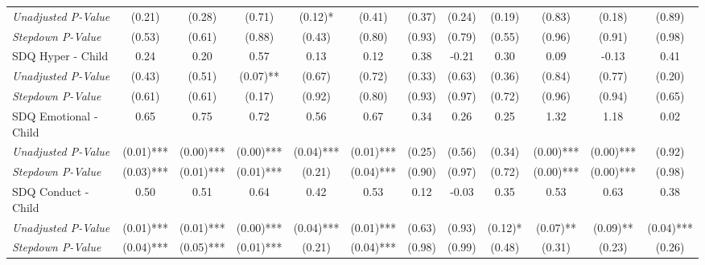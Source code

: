 \begin{tabular}{l c c c c c c c c c c c}
\quad \textit{Unadjusted P-Value} & (0.21) & (0.28) & (0.71) & (0.12)* & (0.41) & (0.37) & (0.24) & (0.19) & (0.83) & (0.18) & (0.89) \\
\quad \textit{Stepdown P-Value} & (0.53) & (0.61) & (0.88) & (0.43) & (0.80) & (0.93) & (0.79) & (0.55) & (0.96) & (0.91) & (0.98) \\
SDQ Hyper - Child & 0.24 & 0.20 & 0.57 & 0.13 & 0.12 & 0.38 & -0.21 & 0.30 & 0.09 & -0.13 & 0.41 \\
\quad \textit{Unadjusted P-Value} & (0.43) & (0.51) & (0.07)** & (0.67) & (0.72) & (0.33) & (0.63) & (0.36) & (0.84) & (0.77) & (0.20) \\
\quad \textit{Stepdown P-Value} & (0.61) & (0.61) & (0.17) & (0.92) & (0.80) & (0.93) & (0.97) & (0.72) & (0.96) & (0.94) & (0.65) \\
SDQ Emotional - Child & 0.65 & 0.75 & 0.72 & 0.56 & 0.67 & 0.34 & 0.26 & 0.25 & 1.32 & 1.18 & 0.02 \\
\quad \textit{Unadjusted P-Value} & (0.01)*** & (0.00)*** & (0.00)*** & (0.04)*** & (0.01)*** & (0.25) & (0.56) & (0.34) & (0.00)*** & (0.00)*** & (0.92) \\
\quad \textit{Stepdown P-Value} & (0.03)*** & (0.01)*** & (0.01)*** & (0.21) & (0.04)*** & (0.90) & (0.97) & (0.72) & (0.00)*** & (0.00)*** & (0.98) \\
SDQ Conduct - Child & 0.50 & 0.51 & 0.64 & 0.42 & 0.53 & 0.12 & -0.03 & 0.35 & 0.53 & 0.63 & 0.38 \\
\quad \textit{Unadjusted P-Value} & (0.01)*** & (0.01)*** & (0.00)*** & (0.04)*** & (0.01)*** & (0.63) & (0.93) & (0.12)* & (0.07)** & (0.09)** & (0.04)*** \\
\quad \textit{Stepdown P-Value} & (0.04)*** & (0.05)*** & (0.01)*** & (0.21) & (0.04)*** & (0.98) & (0.99) & (0.48) & (0.31) & (0.23) & (0.26) \\
\bottomrule
\end{tabular}
